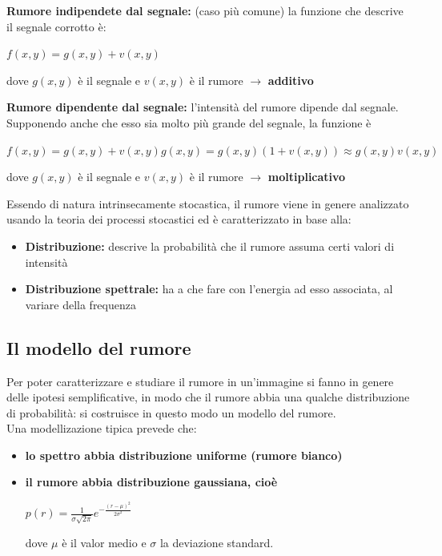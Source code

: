 \begin{trivlist}
    \item \textbf{Rumore indipendete dal segnale:} (caso più comune) la funzione che descrive il segnale corrotto è:

    \begin{center}
        $f(x,y) = g(x,y)+v(x,y)$
    \end{center}

    dove $g(x,y)$ è il segnale e $v(x,y)$ è il rumore $\rightarrow$ \textbf{additivo}

    \item \textbf{Rumore dipendente dal segnale:} l'intensità del rumore dipende dal
    segnale. Supponendo anche che esso sia molto più grande del segnale, la funzione è

    \begin{center}
        $f(x,y)=g(x,y)+v(x,y)g(x,y)=g(x,y)(1+v(x,y)) \approx g(x,y)v(x,y)$
    \end{center}

    dove $g(x,y)$ è il segnale e $v(x,y)$ è il rumore $\rightarrow$ \textbf{moltiplicativo}
\end{trivlist}

Essendo di natura intrinsecamente stocastica, il rumore viene in genere analizzato usando la teoria dei processi stocastici ed è
caratterizzato in base alla:

\begin{itemize}
    \item \textbf{Distribuzione:} descrive la probabilità che il rumore assuma
          certi valori di intensità
    \item \textbf{Distribuzione spettrale:} ha a che fare con l'energia ad esso
          associata, al variare della frequenza
\end{itemize}

\subsection{Il modello del rumore}

Per poter caratterizzare e studiare il rumore in un'immagine si fanno in genere delle ipotesi semplificative, in modo che il rumore abbia una qualche distribuzione di probabilità: si costruisce in
questo modo un modello del rumore.
\\Una modellizazione tipica prevede che:

\begin{itemize}
    \item \textbf{lo spettro abbia distribuzione uniforme (rumore bianco)}
    \item \textbf{il rumore abbia distribuzione gaussiana, cioè}
          \begin{center}
              $p(r)=\frac{1}{\sigma \sqrt{2 \pi}}e^{-\frac{(r-\mu)^2}{2\sigma^2}}$
          \end{center}
          dove $\mu$ è il valor medio e $\sigma$ la deviazione standard.
\end{itemize}

